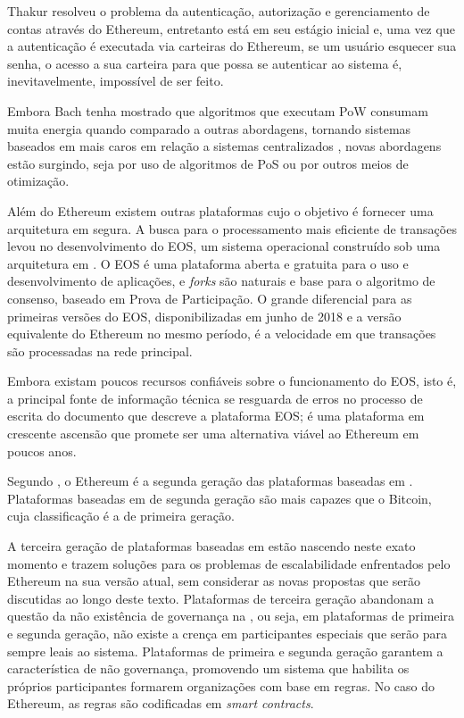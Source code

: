 \documentclass[tcc,capa]{texufpel}
\begin{document}
    Thakur resolveu o problema da autenticação, autorização e gerenciamento de contas através do Ethereum, entretanto está em seu estágio inicial e, uma vez que a autenticação é executada via carteiras do Ethereum, se um usuário esquecer sua senha, o acesso a sua carteira para que possa se autenticar ao sistema é, inevitavelmente, impossível de ser feito.
    
    Embora Bach tenha mostrado que algoritmos que executam PoW consumam muita energia quando comparado a outras abordagens, tornando sistemas baseados em \bchain mais caros em relação a sistemas centralizados \cite{bach2018comparative}, novas abordagens estão surgindo, seja por uso de algoritmos de PoS ou por outros meios de otimização.
    
    Além do Ethereum existem outras plataformas cujo o objetivo é fornecer uma arquitetura em \bchain segura. A busca para o processamento mais eficiente de transações levou no desenvolvimento do EOS, um sistema operacional construído sob uma arquitetura em \bchain \cite{eos2018}. O EOS é uma plataforma aberta e gratuita para o uso e desenvolvimento de aplicações, e \textit{forks} são naturais e base para o algoritmo de consenso, baseado em Prova de Participação. O grande diferencial para as primeiras versões do EOS, disponibilizadas em junho de 2018 e a versão equivalente do Ethereum no mesmo período, é a velocidade em que transações são processadas na rede principal.
    
    Embora existam poucos recursos confiáveis sobre o funcionamento do EOS, isto é, a principal fonte de informação técnica se resguarda de erros no processo de escrita do documento que descreve a plataforma EOS; é uma plataforma em crescente ascensão que promete ser uma alternativa viável ao Ethereum em poucos anos.
    
    Segundo \cite{spurjeonsurvey}, o Ethereum é a segunda geração das plataformas baseadas em \bchain. Plataformas baseadas em \bchain de segunda geração são mais capazes que o Bitcoin, cuja classificação é a de primeira geração. 
    
    A terceira geração de plataformas baseadas em \bchain estão nascendo neste exato momento e trazem soluções para os problemas de escalabilidade enfrentados pelo Ethereum na sua versão atual, sem considerar as novas propostas que serão discutidas ao longo deste texto. Plataformas de terceira geração abandonam a questão da não existência de governança na \bchain, ou seja, em plataformas de primeira e segunda geração, não existe a crença em participantes especiais que serão para sempre leais ao sistema. Plataformas de primeira e segunda geração garantem a característica de não governança, promovendo um sistema que habilita os próprios participantes formarem organizações com base em regras. No caso do Ethereum, as regras são codificadas em \textit{smart contracts}.
    
\end{document}
